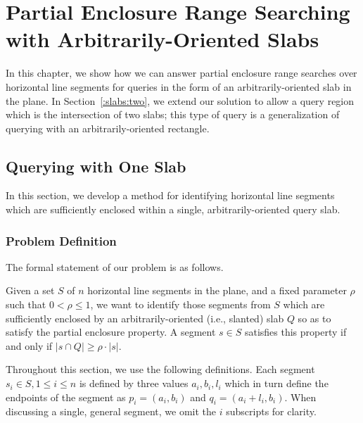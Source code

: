 \chapter{Partial Enclosure Range Searching with Arbitrarily-Oriented Slabs}
\label{:slabs}

In this chapter, we show how we can answer partial enclosure range searches over horizontal line segments for queries in the form of an arbitrarily-oriented slab in the plane.  In Section~\ref{:slabs:two}, we extend our solution to allow a query region which is the intersection of two slabs; this type of query is a generalization of querying with an arbitrarily-oriented rectangle.

\section{Querying with One Slab}
\label{:slabs:one}

In this section, we develop a method for identifying horizontal line segments which are sufficiently enclosed within a single, arbitrarily-oriented query slab.


\subsection{Problem Definition}
\label{:slabs:one:problem-definition}

The formal statement of our problem is as follows.

\begin{problem}
Given a set $S$ of $n$ horizontal line segments in the plane, and a fixed parameter $\rho$ such that $0 < \rho \leq 1$, we want to identify those segments from $S$ which are sufficiently enclosed by an arbitrarily-oriented (i.e., slanted) slab $Q$ so as to satisfy the partial enclosure property.
A segment $s \in S$ satisfies this property if and only if $|s \cap Q| \geq \rho \cdot |s|$.
\end{problem}

Throughout this section, we use the following definitions. Each segment $s_i \in S, 1 \leq i \leq n$ is defined by three values $a_i, b_i, l_i$ which in turn define the endpoints of the segment as $p_i = (a_i, b_i)$ and $q_i = (a_i + l_i, b_i)$. When discussing a single, general segment, we omit the $i$ subscripts for clarity.

